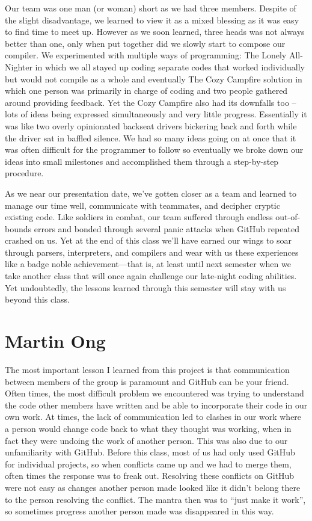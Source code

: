 \documentclass[11pt]{report}
\begin{document}
Our team was one man (or woman) short as we had three members. Despite of the slight disadvantage, we learned to view it as a mixed blessing as it was easy to find time to meet up. However as we soon learned, three heads was not always better than one, only when put together did we slowly start to compose our compiler. We experimented with multiple ways of programming: The Lonely All-Nighter in which we all stayed up coding separate codes that worked individually but would not compile as a whole and eventually The Cozy Campfire solution in which one person was primarily in charge of coding and two people gathered around providing feedback. Yet the Cozy Campfire also had its downfalls too – lots of ideas being expressed simultaneously and very little progress. Essentially it was like two overly opinionated backseat drivers bickering back and forth while the driver sat in baffled silence. We had so many ideas going on at once that it was often difficult for the programmer to follow so eventually we broke down our ideas into small milestones and accomplished them through a step-by-step procedure.

As we near our presentation date, we’ve gotten closer as a team and learned to manage our time well, communicate with teammates, and decipher cryptic existing code. Like soldiers in combat, our team suffered through endless out-of-bounds errors and bonded through several panic attacks when GitHub repeated crashed on us. Yet at the end of this class we’ll have earned our wings to soar through parsers, interpreters, and compilers and wear with us these experiences like a badge noble achievement—that is, at least until next semester when we take another class that will once again challenge our late-night coding abilities. Yet undoubtedly, the lessons learned through this semester will stay with us beyond this class.

\section{Martin Ong}
The most important lesson I learned from this project is that communication between members of the group is paramount and GitHub can be your friend. Often times, the most difficult problem we encountered was trying to understand the code other members have written and be able to incorporate their code in our own work. At times, the lack of communication led to clashes in our work where a person would change code back to what they thought was working, when in fact they were undoing the work of another person. This was also due to our unfamiliarity with GitHub. Before this class, most of us had only used GitHub for individual projects, so when conflicts came up and we had to merge them, often times the response was to freak out. Resolving these conflicts on GitHub were not easy as changes another person made looked like it didn't belong there to the person resolving the conflict. The mantra then was to ``just make it work'', so sometimes progress another person made was disappeared in this way.
\end{document}
